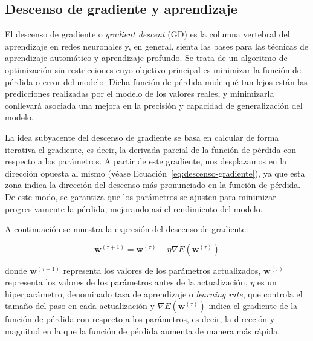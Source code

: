 \subsection{Descenso de gradiente y aprendizaje}\label{subsec:descenso-gradiente}

El descenso de gradiente o \emph{gradient descent} (GD) es la columna vertebral del aprendizaje en redes neuronales y, en general, sienta las bases para las técnicas de aprendizaje automático y aprendizaje profundo. Se trata de un algoritmo de optimización sin restricciones cuyo objetivo principal es minimizar la función de pérdida o error del modelo. Dicha función de pérdida mide qué tan lejos están las predicciones realizadas por el modelo de los valores reales, y minimizarla conllevará asociada una mejora en la precisión y capacidad de generalización del modelo.\newline

La idea subyacente del descenso de gradiente se basa en calcular de forma iterativa el gradiente, es decir, la derivada parcial de la función de pérdida con respecto a los parámetros. A partir de este gradiente, nos desplazamos en la dirección opuesta al mismo (véase Ecuación~\eqref{eq:descenso-gradiente}), ya que esta zona indica la dirección del descenso más pronunciado en la función de pérdida. De este modo, se garantiza que los parámetros se ajusten para minimizar progresivamente la pérdida, mejorando así el rendimiento del modelo.\newline

A continuación se muestra la expresión del descenso de gradiente:

\begin{equation}
    \mathbf{w}^{(\tau + 1)} = \mathbf{w}^{(\tau)} - \eta \nabla E(\mathbf{w}^{(\tau)})
    \label{eq:descenso-gradiente}
\end{equation}

donde $\mathbf{w}^{(\tau + 1)}$ representa los valores de los parámetros actualizados, $\mathbf{w}^{(\tau)}$ representa los valores de los parámetros antes de la actualización, $\eta$ es un hiperparámetro, denominado tasa de aprendizaje o \emph{learning rate}, que controla el tamaño del paso en cada actualización y $\nabla E(\mathbf{w}^{(\tau)})$ indica el gradiente de la función de pérdida con respecto a los parámetros, es decir, la dirección y magnitud en la que la función de pérdida aumenta de manera más rápida.\newline

